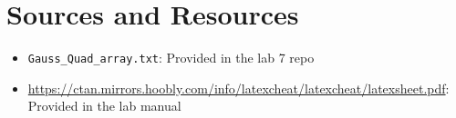 \documentclass{article}
\begin{document}
\newpage

\section{Sources and Resources}

\begin{flushleft}
\begin{itemize}
    \item{\texttt{Gauss\_Quad\_array.txt}: Provided in the lab 7 repo}
    \item{\url{https://ctan.mirrors.hoobly.com/info/latexcheat/latexcheat/latexsheet.pdf}: Provided in the lab manual}
\end{itemize}
\end{flushleft}
\end{document}
